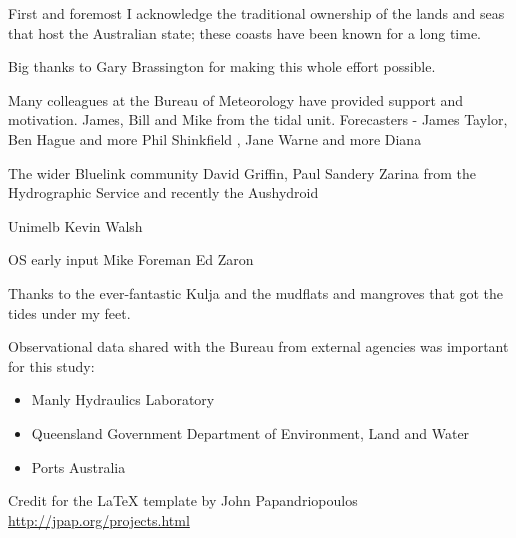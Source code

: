 
\begin{acknowledgements}

{\parindent0pt

First and foremost I acknowledge the traditional ownership of the lands and seas that host the Australian state; these coasts have been known for a long time.
\newline{}
    
Big thanks to Gary Brassington for making this whole effort possible.

\newline{}
Many colleagues at the Bureau of Meteorology have provided support and motivation. 
James, Bill and Mike from the tidal unit. 
Forecasters - James Taylor, Ben Hague and more
Phil Shinkfield , Jane Warne and more
Diana
    
The wider Bluelink community
David Griffin, Paul Sandery    
Zarina from the Hydrographic Service and  recently the Aushydroid    
    
Unimelb
Kevin Walsh

OS early input 
Mike Foreman
Ed Zaron

Thanks to the ever-fantastic Kulja and the mudflats and mangroves that got the tides under my feet.   
\newline{}

Observational data shared with the Bureau from external agencies was important for this study:
\begin{itemize}
    \item Manly Hydraulics Laboratory %
    \item Queensland Government Department of Environment, Land and Water
    \item Ports Australia
\end{itemize}


Credit for the LaTeX template by John Papandriopoulos  \url{http://jpap.org/projects.html}

}   %
\end{acknowledgements}
